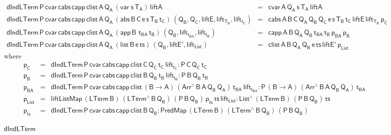 \documentclass[sigplan,10pt]{acmart}
\begin{document}
\begin{figure*}[t]

    \begin{adjustbox}{varwidth=7.3in, max width=7.1in, margin=-0.0in 0in
      -0.2in 0in, fbox, center} 
  
{\small
\[\begin{array}{lll}
\mathsf{dIndLTerm \, P\, cvar \, cabs\, capp\, clist \, A\, Q_A\,
  (var\;s\,T_A) \, liftA} & = & \mathsf{cvar \, A\, Q_A\, s\, T_A\,
  liftA}\\ 
\mathsf{dIndLTerm \, P\, cvar \, cabs\, capp\, clist \, A\, Q_A\,
  (abs \,B \,C \,e \,s \,T_B \, t_C) \, (Q_B , Q_C , liftE,
  lift_{T_B}, lift_{t_C})} & = & \mathsf{cabs\,A\,B\,C\, Q_A\,
  Q_B\, Q_C\, e\, s\, T_B\, t_C\, liftE\, lift_{T_B}\, p_C}\\
\mathsf{dIndLTerm \, P\, cvar \, cabs\, capp\, clist \, A\, Q_A\,
    (app \,B \,\,t_{BA} \, t_B)\, (Q_B , lift_{t_{BA}}, lift_{t_B})} &
= & \mathsf{capp\,A\,B\,Q_A\, Q_B\, t_{BA}\, t_B\, p_{BA} \, p_B}\\
  \mathsf{dIndLTerm \, P\, cvar \, cabs\, capp\, clist \, A\, Q_A\,
    (list \,B \,e \, ts) \, (Q_B , liftE', lift_{List})} & = & 
  \mathsf{clist \,A\,B\,Q_A\, Q_B\, e\, ts\, liftE'\, p_{List} }
\end{array}\]}
\mbox{where}
{\small
\[\begin{array}{lll}
\mathsf{p_C} & = & \mathsf{dIndLTerm\,P\,cvar\,cabs \,capp \,clist\,
  C\, Q_C\, t_C\, lift_{t_C} : P \, C\, Q_C \, t_C }\\
\mathsf{p_B} & = & \mathsf{dIndLTerm\,P\,cvar\,cabs \,capp \,clist\,
  B\, Q_B\, t_B\, lift_{t_B} : P \, B\, Q_B \, t_B }\\
\mathsf{p_{BA}} & = & \mathsf{dIndLTerm\,P\,cvar\,cabs \,capp
  \,clist\, (B \to A)\,(Arr^{\wedge} \, B\, A\, Q_B \, Q_A) \,
  t_{BA}\, lift_{t_{BA}} : P \, (B \to A)\, (Arr^{\wedge} \, B\, A\,
  Q_B \, Q_A) \, t_{BA}}\\ 
\mathsf{p_{List}} & = &\mathsf{liftListMap \, (LTerm\, B) \,
  (LTerm^{\wedge} \, B \, Q_B)\, (P\,B\,Q_B)\, p_{ts} \, ts\,
  lift_{List} : List^{\wedge}\, (LTerm\,B) \, (P\,B\,Q_B) \, ts}\\
\mathsf{p_{ts}} & = & \mathsf{dIndLTerm\, P\, cvar\, cabs\, capp\,
  clist\, B\, Q_B : PredMap\,(LTerm\,B) \,(LTerm^{\wedge}\, B\, Q_B)
  \, (P\,B\,Q_B)}
\end{array}\]}

\vspace*{-0.1in}

\caption{$\mathsf{dIndLTerm}$}\label{fig:dindlterm} \vspace*{0.1in} 
\end{adjustbox}
\end{figure*}
\end{document}
